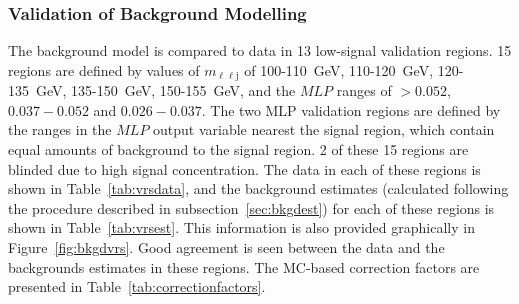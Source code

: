 \documentclass[NOTE, atlasdraft=true, texlive=2017, UKenglish]{\ATLASLATEXPATH atlasdoc}
\begin{document}



\subsubsection{Validation of Background Modelling}
\label{sec:bkgdval}

The background model is compared to data in 13 low-signal validation regions. 15 regions are defined by values of $m_{\ell\ell\text{j}}$ of 100-110~GeV, 110-120~GeV, 120-135~GeV, 135-150~GeV, 150-155~GeV, and the $MLP$ ranges of $>0.052$, $0.037-0.052$ and $0.026-0.037$. The two MLP validation regions are defined by the ranges in the $MLP$ output variable nearest the signal region, which contain equal amounts of background to the signal region. 2 of these 15 regions are blinded due to high signal concentration. The data in each of these regions is shown in Table~\ref{tab:vrsdata}, and the background estimates (calculated following the procedure described in subsection~\ref{sec:bkgdest}) for each of these regions is shown in Table~\ref{tab:vrsest}. This information is also provided graphically in Figure~\ref{fig:bkgdvrs}. Good agreement is seen between the data and the backgrounds estimates in these regions. The MC-based correction factors are presented in Table~\ref{tab:correctionfactors}.
\end{document}

